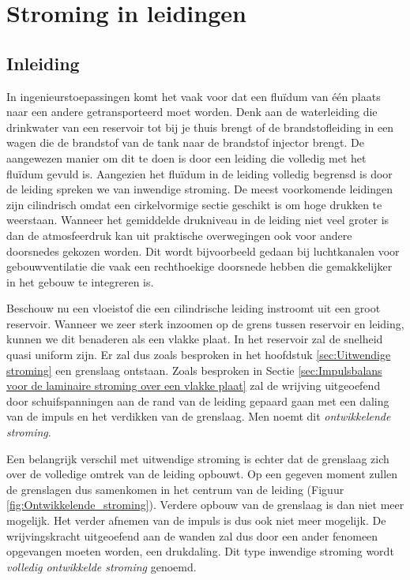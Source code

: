 \chapter{Stroming in leidingen}
\label{sec:Stroming in leidingen}

	\section{Inleiding}
	\label{sec:Stroming in leidingen Inleiding}
In ingenieurstoepassingen komt het vaak voor dat een fluïdum van één plaats naar een andere getransporteerd moet worden. Denk aan de waterleiding die drinkwater van een reservoir tot bij je thuis brengt of de brandstofleiding in een wagen die de brandstof van de tank naar de brandstof injector brengt. De aangewezen manier om dit te doen is door een leiding die volledig met het fluïdum gevuld is. Aangezien het fluïdum in de leiding volledig begrensd is door de leiding spreken we van inwendige stroming. De meest voorkomende leidingen zijn cilindrisch omdat een cirkelvormige sectie geschikt is om hoge drukken te weerstaan. Wanneer het gemiddelde drukniveau in de leiding niet veel groter is dan de atmosfeerdruk kan uit praktische overwegingen ook voor andere doorsnedes gekozen worden. Dit wordt bijvoorbeeld gedaan bij luchtkanalen voor gebouwventilatie die vaak een rechthoekige doorsnede hebben die gemakkelijker in het gebouw te integreren is.

Beschouw nu een vloeistof die een cilindrische leiding instroomt uit een groot reservoir. Wanneer we zeer sterk inzoomen op de grens tussen reservoir en leiding, kunnen we dit benaderen als een vlakke plaat. In het reservoir zal de snelheid quasi uniform zijn. Er zal dus zoals besproken in het hoofdstuk \ref{sec:Uitwendige stroming} een grenslaag ontstaan. Zoals besproken in Sectie \ref{sec:Impulsbalans voor de laminaire stroming over een vlakke plaat} zal de wrijving uitgeoefend door schuifspanningen aan de rand van de leiding gepaard gaan met een daling van de impuls en het verdikken van de grenslaag. Men noemt dit \emph{ontwikkelende stroming}.

Een belangrijk verschil met uitwendige stroming is echter dat de grenslaag zich over de volledige omtrek van de leiding opbouwt. Op een gegeven moment zullen de grenslagen dus samenkomen in het centrum van de leiding (Figuur \ref{fig:Ontwikkelende_stroming}). Verdere opbouw van de grenslaag is dan niet meer mogelijk. Het verder afnemen van de impuls is dus ook niet meer mogelijk. De wrijvingskracht uitgeoefend aan de wanden zal dus door een ander fenomeen opgevangen moeten worden, een drukdaling. Dit type inwendige stroming wordt \emph{volledig ontwikkelde stroming} genoemd.

